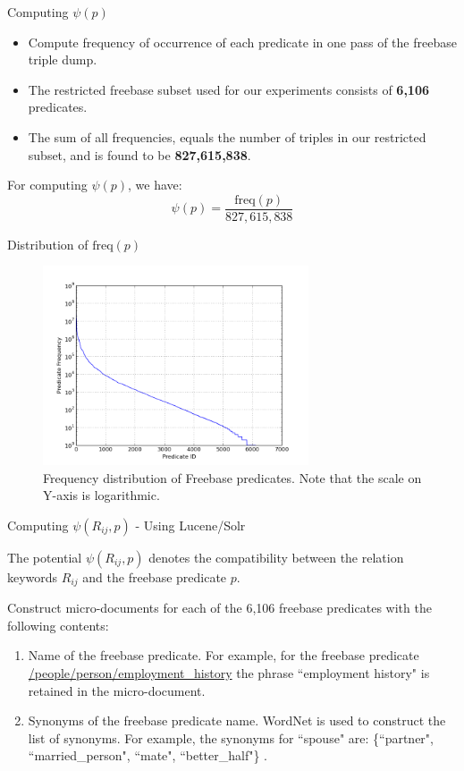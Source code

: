 \documentclass[pdf,11pt]{beamer}
\begin{document}
\begin{frame}{Computing $\psi(p)$}
\begin{itemize}
\item Compute frequency of occurrence of each predicate in one pass of the freebase triple dump.
\item The restricted freebase subset used for our experiments consists of \textbf{6,106} predicates.
\item The sum of all frequencies, equals the number of triples in our restricted subset, and is found to be \textbf{827,615,838}.
\end{itemize}
For computing $\psi(p)$, we have:
$$\psi(p) = \frac{\text{freq}(p)}{827,615,838}$$
\end{frame}


\begin{frame}{Distribution of $\text{freq}(p)$}

\begin{figure}[h!] \label{preddist}
\centering
\includegraphics[width=0.7\textwidth]{./images/pred-freq}
\caption{Frequency distribution of Freebase predicates. Note that the scale on Y-axis is logarithmic.}
\end{figure}

\end{frame}

\begin{frame}{Computing $\psi(R_{ij},p)$ - Using Lucene/Solr}
\begin{block}{}
The potential $\psi(R_{ij},p)$ denotes the compatibility between the relation keywords $R_{ij}$ and the freebase predicate $p$.
\end{block}

Construct micro-documents for each of the 6,106 freebase predicates with the following contents:
\begin{enumerate}
\item Name of the freebase predicate. For example, for the freebase predicate \url{/people/person/employment_history} the phrase ``employment history" is retained in the micro-document.
\item Synonyms of the freebase predicate name. WordNet is used to construct the list of synonyms. For example, the synonyms for ``spouse" are: \{``partner", ``married\_person", ``mate", ``better\_half"\}
.\end{enumerate}

\end{frame}
\end{document}
